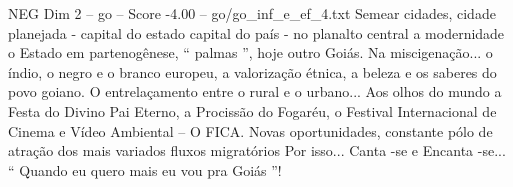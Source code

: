 \begin{textsample}{NEG Dim 2 – go – Score -4.00 – go/go\_inf\_e\_ef\_4.txt}
Semear cidades, cidade planejada - capital do estado capital do país - no planalto central a modernidade o Estado em partenogênese, “ palmas ”, hoje outro Goiás.
Na miscigenação... o índio, o negro e o branco europeu, a valorização étnica, a beleza e os saberes do povo goiano.
O entrelaçamento entre o rural e o urbano...
Aos olhos do mundo a Festa do Divino Pai Eterno, a Procissão do Fogaréu, o Festival Internacional de Cinema e Vídeo Ambiental – O FICA.
Novas oportunidades, constante pólo de atração dos mais variados fluxos migratórios Por isso...
Canta -se e Encanta -se... “ Quando eu quero mais eu vou pra Goiás ”!

\end{textsample}
